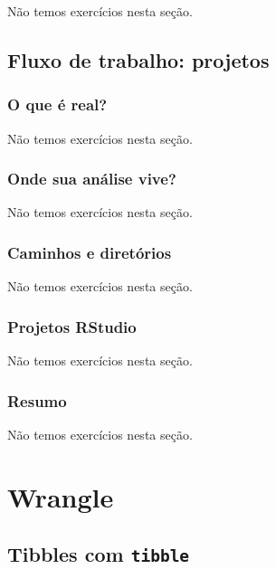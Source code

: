 \documentclass[
]{latex/krantz}
\theoremstyle{definition}
\theoremstyle{definition}
\theoremstyle{definition}
\theoremstyle{definition}
\theoremstyle{remark}
\begin{document}
Não temos exercícios nesta seção.

\hypertarget{fluxo-de-trabalho-projetos}{%
\chapter{Fluxo de trabalho: projetos}\label{fluxo-de-trabalho-projetos}}

\hypertarget{o-que-uxe9-real}{%
\section{O que é real?}\label{o-que-uxe9-real}}

Não temos exercícios nesta seção.

\hypertarget{onde-sua-anuxe1lise-vive}{%
\section{Onde sua análise vive?}\label{onde-sua-anuxe1lise-vive}}

Não temos exercícios nesta seção.

\hypertarget{caminhos-e-diretuxf3rios}{%
\section{Caminhos e diretórios}\label{caminhos-e-diretuxf3rios}}

Não temos exercícios nesta seção.

\hypertarget{projetos-rstudio}{%
\section{Projetos RStudio}\label{projetos-rstudio}}

Não temos exercícios nesta seção.

\hypertarget{resumo}{%
\section{Resumo}\label{resumo}}

Não temos exercícios nesta seção.

\hypertarget{part-wrangle}{%
\part{Wrangle}\label{part-wrangle}}

\hypertarget{tibbles-com-tibble}{%
\chapter{\texorpdfstring{Tibbles com \texttt{tibble}}{Tibbles com tibble}}\label{tibbles-com-tibble}}
\end{document}

